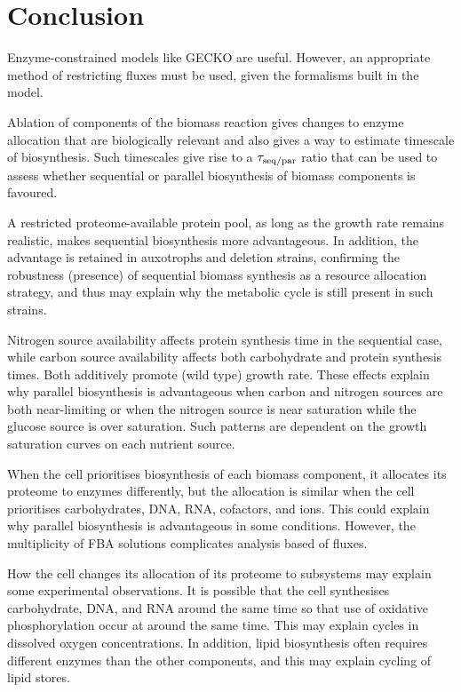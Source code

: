 \section{Conclusion}
\label{subsec:model-conclusion}

Enzyme-constrained models like GECKO are useful.
However, an appropriate method of restricting fluxes must be used, given the formalisms built in the model.

Ablation of components of the biomass reaction gives changes to enzyme allocation that are biologically relevant and also gives a way to estimate timescale of biosynthesis.
Such timescales give rise to a $\tau_{\mathrm{seq}/\mathrm{par}}$ ratio that can be used to assess whether sequential or parallel biosynthesis of biomass components is favoured.

A restricted proteome-available protein pool, as long as the growth rate remains realistic, makes sequential biosynthesis more advantageous.
In addition, the advantage is retained in auxotrophs and deletion strains, confirming the robustness (presence) of sequential biomass synthesis as a resource allocation strategy, and thus may explain why the metabolic cycle is still present in such strains.

Nitrogen source availability affects protein synthesis time in the sequential case, while carbon source availability affects both carbohydrate and protein synthesis times.
Both additively promote (wild type) growth rate.
These effects explain why parallel biosynthesis is advantageous when carbon and nitrogen sources are both near-limiting or when the nitrogen source is near saturation while the glucose source is over saturation.
Such patterns are dependent on the growth saturation curves on each nutrient source.

When the cell prioritises biosynthesis of each biomass component, it allocates its proteome to enzymes differently, but the allocation is similar when the cell prioritises carbohydrates, DNA, RNA, cofactors, and ions.
This could explain why parallel biosynthesis is advantageous in some conditions.
However, the multiplicity of FBA solutions complicates analysis based of fluxes.

How the cell changes its allocation of its proteome to subsystems may explain some experimental observations.
It is possible that the cell synthesises carbohydrate, DNA, and RNA around the same time so that use of  oxidative phosphorylation occur at around the same time.
This may explain cycles in dissolved oxygen concentrations.
In addition, lipid biosynthesis often requires different enzymes than the other components, and this may explain cycling of lipid stores.

